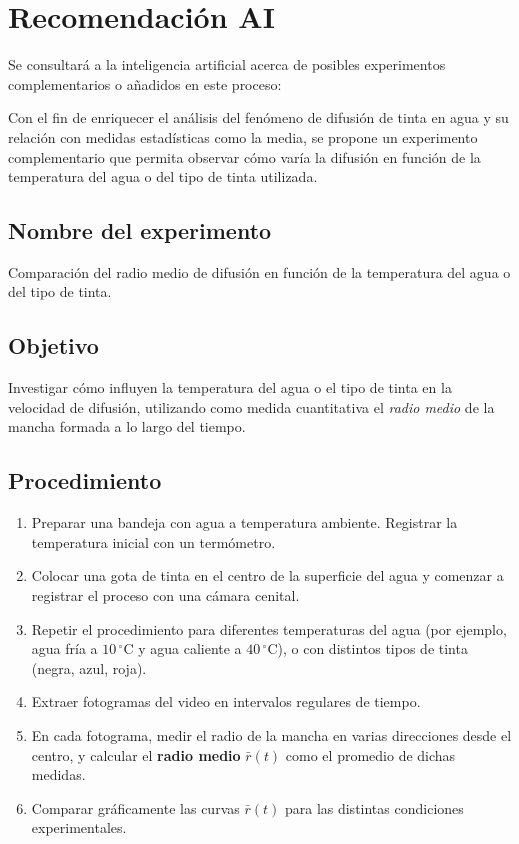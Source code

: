 \documentclass[11pt]{article}
\begin{document}
\section*{Recomendación AI}
Se consultará a la inteligencia artificial acerca de posibles experimentos complementarios o añadidos en este proceso:

\begin{tcolorbox}[colback=blue!5!white,colframe=blue!75!black,title=Propuesta de Experimento Complementario]
Con el fin de enriquecer el análisis del fenómeno de difusión de tinta en agua y su relación con medidas estadísticas como la media, se propone un experimento complementario que permita observar cómo varía la difusión en función de la temperatura del agua o del tipo de tinta utilizada.

\subsection*{Nombre del experimento}
Comparación del radio medio de difusión en función de la temperatura del agua o del tipo de tinta.

\subsection*{Objetivo}
Investigar cómo influyen la temperatura del agua o el tipo de tinta en la velocidad de difusión, utilizando como medida cuantitativa el \emph{radio medio} de la mancha formada a lo largo del tiempo.

\subsection*{Procedimiento}
\begin{enumerate}
    \item Preparar una bandeja con agua a temperatura ambiente. Registrar la temperatura inicial con un termómetro.
    \item Colocar una gota de tinta en el centro de la superficie del agua y comenzar a registrar el proceso con una cámara cenital.
    \item Repetir el procedimiento para diferentes temperaturas del agua (por ejemplo, agua fría a $10\,^\circ$C y agua caliente a $40\,^\circ$C), o con distintos tipos de tinta (negra, azul, roja).
    \item Extraer fotogramas del video en intervalos regulares de tiempo.
    \item En cada fotograma, medir el radio de la mancha en varias direcciones desde el centro, y calcular el \textbf{radio medio} $\bar{r}(t)$ como el promedio de dichas medidas.
    \item Comparar gráficamente las curvas $\bar{r}(t)$ para las distintas condiciones experimentales.
\end{enumerate}


\end{tcolorbox}
\end{document}
